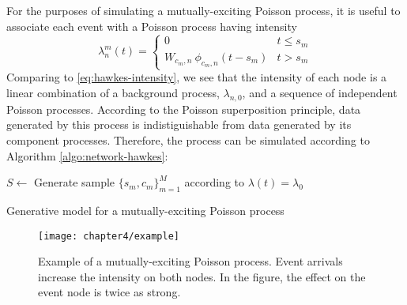 		For the purposes of simulating a mutually-exciting Poisson process, it is useful to associate each event with a Poisson process having intensity
		\begin{equation}
			\lambda_n^m(t) = \begin{cases}
						             0 & t \le s_m \\
						             W_{c_m, n} \ \phi_{c_m, n}(t - s_m) & t > s_m
						      		 \end{cases}
		\end{equation}
		Comparing to \eqref{eq:hawkes-intensity}, we see that the intensity of each node is a linear combination of a background process, $\lambda_{n,0}$, and a sequence of independent Poisson processes. According to the Poisson superposition principle, data generated by this process is indistiguishable from data generated by its component processes. Therefore, the process can be simulated according to Algorithm \ref{algo:network-hawkes}:

		\begin{algorithm}
				\begin{algorithmic}
					\vspace{1mm}
					\STATE $S \gets$ Generate sample $\{s_m, c_m\}_{m=1}^M$ according to $\lambda(t) = \lambda_0$
					\REPEAT
						\ENDFOR
			\end{algorithmic}
			\caption{Generative model for a mutually-exciting Poisson process}
			\label{algo:network-hawkes}
		\end{algorithm}

		\begin{figure}[t]
			\small
			\linespread{1}
			\centering
			\label{fig:example_chapter4}
			\texttt{[image: chapter4/example]}
			\captionsetup{skip=-20pt, labelsep=colon, font=footnotesize, width=\linewidth}
			\caption[Example of a mutually-exciting Poisson process.]{Example of a mutually-exciting Poisson process. Event arrivals increase the intensity on both nodes. In the figure, the effect on the event node is twice as strong.}
		\end{figure}

